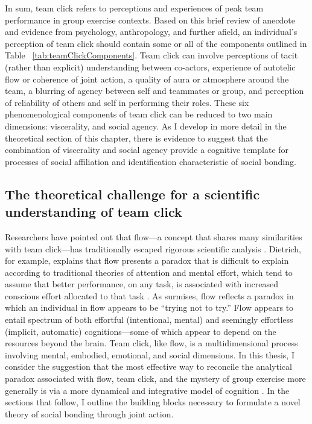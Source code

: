 \begin{CJK}{UTF8}{gbsn}
In sum, team click refers to perceptions and experiences of peak team performance in group exercise contexts.  Based on this brief review of anecdote and evidence from psychology, anthropology, and further afield, an individual's perception of team click should contain some or all of the components outlined in Table ~\ref{tab:teamClickComponents}.  Team click can involve perceptions of tacit (rather than explicit) understanding between co-actors, experience of autotelic flow or coherence of joint action, a quality of aura or atmosphere around the team, a blurring of agency between self and teammates or group, and perception of reliability of others and self in performing their roles.  These six phenomenological components of team click can be reduced to two main dimensions: viscerality, and social agency.  As I develop in more detail in the theoretical section of this chapter, there is evidence to suggest that the combination of viscerality and social agency provide a cognitive template for processes of social affiliation and identification characteristic of social bonding.



\subsection{The theoretical challenge for a scientific understanding of team click}
Researchers have pointed out that flow---a concept that shares many similarities with team click---has traditionally escaped rigorous scientific analysis \citep{Dietrich2010a,Slingerland2014}.  Dietrich, for example, explains that flow presents a paradox that is difficult to explain according to traditional theories of attention and mental effort, which tend to assume that better performance, on any task, is associated with increased conscious effort allocated to that task \citep{Dietrich2004b}.  As \textcite{Slingerland2014} surmises, flow reflects a paradox in which an individual in flow appears to be ``trying not to try.''  Flow appears to entail spectrum of both effortful (intentional, mental) and seemingly effortless (implicit, automatic) cognitions---some of which appear to depend on the resources beyond the brain.  Team click, like flow, is a multidimensional process involving mental, embodied, emotional, and social dimensions.  In this thesis, I consider the suggestion that the most effective way to reconcile the analytical paradox associated with flow, team click, and the mystery of group exercise more generally is via a more dynamical and integrative model of cognition \citep{Clark2015}.  In the sections that follow, I outline the building blocks necessary to formulate a novel theory of social bonding through joint action.



\end{CJK}
